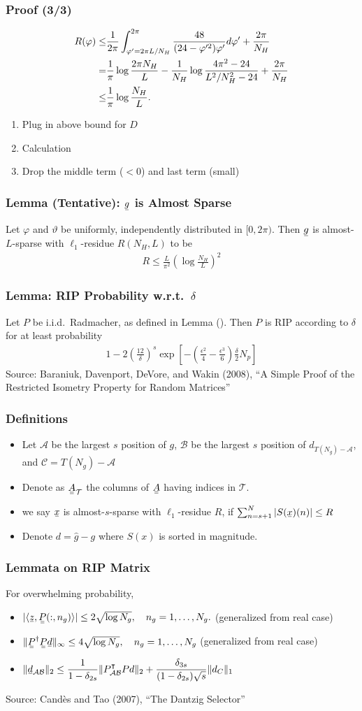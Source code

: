 \documentclass{beamer}
\newcommand{\Disp}[1]{\begin{align} #1 \end{align}}
\renewcommand{\H}{\dagger}
\newcommand{\Tr}{\intercal}
\newcommand{\NT}{\notag}
\renewcommand{\d}{\delta}
\newcommand{\f}{\varphi}
\renewcommand{\th}{\vartheta}
\newcommand{\I}{\item}
\newcommand{\MC}[1]{\mathcal{#1}}
\newcommand{\R}[1]{\sqrt{#1}}
\newcommand{\F}[1]{\frac{#1}}
\newcommand{\V}[1]{\stackunder[1.2pt]{$#1$}{\rule{.9ex}{.075ex}}}
\newcommand{\M}[1]{\V{\V{#1}}}
\newcommand{\IP}[1]{\langle #1 \rangle}
\begin{document}
\begin{frame}
\frametitle{Proof (3/3)}
\Disp{
R(\f)
\leq &\F{1}{2\pi} \int_{\f'=2\pi L/N_H}^{2\pi} \F{48}{(24 -\f'^2) \f'} d \f'
+\F{2\pi} {N_H} \NT \\
=&\F{1}{\pi} \log \F{2\pi N_H}{L}
-\F{1}{N_H} \log \F{4\pi^2 -24} {L^2/N_H^2 -24}
+\F{2\pi} {N_H} \\
\leq &\F{1}{\pi} \log \F{N_H}{L}.
}
\begin{enumerate}
\I Plug in above bound for \(D\)
\I Calculation
\I Drop the middle term (\(<0\)) and last term (small)
\end{enumerate}
\end{frame}

\begin{frame}
\frametitle{Lemma (Tentative): \(\V{g}\) is Almost Sparse}
Let \(\f\) and \(\th\) be uniformly, independently distributed in \([0,2\pi)\).
Then \(\V{g}\) is almost-\(L\)-sparse with \(\ell_1\)-residue \(R(N_H, L)\) to be
\Disp{
R
\leq \F{L}{\pi^2} \left( \log \F{N_H}{L} \right)^2
}
\end{frame}



\begin{frame}
\frametitle{Lemma: RIP Probability w.r.t.\ \(\d\)}
Let \(P\) be i.i.d.\ Radmacher, as defined in Lemma ().
Then \(P\) is RIP according to \(\d\) for at least probability
\Disp{
1 -2 \left( \F{12}{\d} \right)^s \exp \left[ - \left( \F{\epsilon^2}{4} -\F{\epsilon^3}{6} \right) \F{\d}{2} N_p \right]
}
{\small Source: Baraniuk, Davenport, DeVore, and Wakin (2008), ``A Simple Proof of the Restricted Isometry Property for Random Matrices''}
\end{frame}

\begin{frame}
\frametitle{Definitions}
\begin{itemize}
\I Let \(\MC{A}\) be the largest \(s\) position of \(g\), \(\MC{B}\) be the largest \(s\) position of \(d_{T(N_g) -\MC{A}}\), and \(\MC{C} =T(N_g) -\MC{A}\)
\I Denote as \(\M{A}_{\MC{T}}\) the columns of \(\M{A}\) having indices in \(\MC{T}\).
\I we say \(\V{x}\) is almost-\(s\)-sparse with \(\ell_1\)-residue \(R\), if \( \sum_{n=s+1}^N |S(\V{x}) (n)| \leq R \)
\I Denote \(d =\hat{g} -g\)
where \(S(x)\) is sorted in magnitude.
\end{itemize}
\end{frame}


\begin{frame}
\frametitle{Lemmata on RIP Matrix}
For overwhelming probability,
\begin{itemize}
\I \( |\IP{ \V{z}, \M{P}(:, n_g) }| \leq 2 \R{\log N_g}, \quad n_g =1, \dotsc, N_g. \)  (generalized from real case)
\I \( \|\M{P}^\H \M{P} \V{d}\|_\infty \leq 4 \R{\log N_g}, \quad n_g =1, \dotsc, N_g \) (generalized from real case)
\I \( \|\V{d}_{\MC{AB}}\|_2 \leq \dfrac{1}{1-\d_{2s}} \|P_{\MC{A}\MC{B}}^\Tr P d\|_2 +\dfrac{\d_{3s}}{(1-\d_{2s}) \R{s}} \|d_{C}\|_1 \)
\end{itemize}
{\small Source: Cand\`es and Tao (2007), ``The Dantzig Selector''}
\end{frame}
\end{document}

